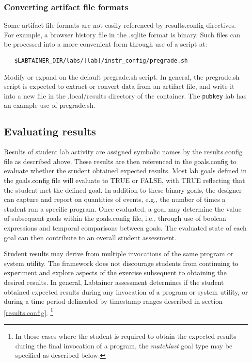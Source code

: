 \documentclass[12pt]{article}
\begin{document}
\subsubsection{Converting artifact file formats}
Some artifact file formats are not easily referenced by results.config directives.
For example, a browser history file in the .sqlite format is binary.  Such files
can be processed into a more convenient form through use of a script at:
\begin{verbatim}
   $LABTAINER_DIR/labs/[lab]/instr_config/pregrade.sh
\end{verbatim}
\noindent Modify or expand on the default pregrade.sh script.
In general, the pregrade.sh script is expected to extract or convert
data from an artifact file, and write it into a new file in the .local/results
directory of the container.  The {\tt pubkey} lab has an example use of pregrade.sh. 

\subsection{Evaluating results}
\label{goals.config}
Results of student lab activity are assigned symbolic names by the results.config file
as described above.  These results are then referenced in the goals.config to evaluate whether
the student obtained expected results.  Most lab goals defined in the goals.config file
will evaluate to TRUE or FALSE, with TRUE reflecting that the student met the defined goal.
In addition to these binary goals, the designer can capture and report on quantities of events,
e.g., the number of times a student ran a specific program.
Once evaluated, a goal may determine the value of subsequent goals within the goals.config file, 
i.e., through use of boolean expressions and temporal comparisons between goals.  The evaluated
state of each goal can then contribute to an overall student assessment.

Student results may derive from multiple invocations of the same program or system utility.  
The framework does not discourage students from continuing to experiment and explore aspects of the 
exercise subsequent to obtaining the desired results.  In general, Labtainer assessment determines if the student
obtained expected results during any invocation of a program or system utility, or during a time period
delineated by timestamp ranges described in section \ref{results.config}.  \footnote{In those cases 
where the student is required to obtain the expected results during the final invocation of a program, 
the \textit{matchlast} goal type may be specified as described below.}
\end{document}
